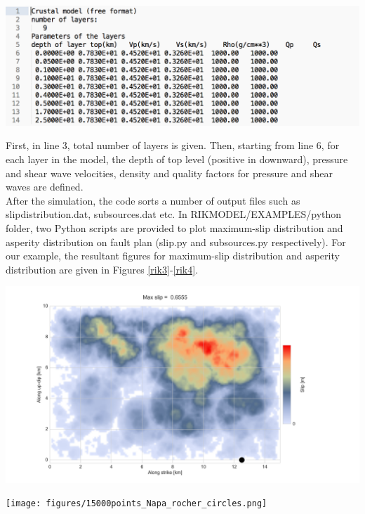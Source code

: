 \begin{center}
\leavevmode
\includegraphics[scale=0.45]{figures/RIK-input2.png} 
\label{rik2} 
\vspace{1cm}
\end{center}



First, in line 3, total number of layers is given. Then, starting from line 6, for each layer in the model, the depth of top level (positive in downward), pressure and shear wave velocities, density and quality factors for pressure and shear waves are defined. \\


After the simulation, the code sorts a number of output files such as slipdistribution.dat, subsources.dat etc. In RIK\textunderscore MODEL/EXAMPLES/python folder, two Python scripts are provided to plot maximum-slip distribution and asperity distribution on fault plan (slip.py and subsources.py respectively). For our example, the resultant figures for maximum-slip distribution and asperity distribution are given in Figures \ref{rik3}-\ref{rik4}.\\




\begin{center}
\leavevmode
\includegraphics[scale=0.35]{figures/15000points_Napa_rocher_slip.png} 
\label{rik3} 
\vspace{1cm}
\end{center}




\begin{center}
\leavevmode
\texttt{[image: figures/15000points\_Napa\_rocher\_circles.png]} 
\label{rik4} 
\vspace{1cm}
\end{center}













 